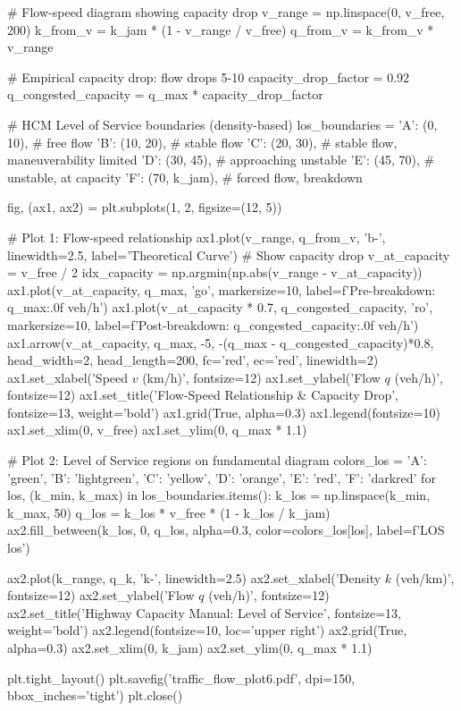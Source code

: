 \documentclass[11pt,a4paper]{article}
\begin{document}
\begin{pycode}
# Flow-speed diagram showing capacity drop
v_range = np.linspace(0, v_free, 200)
k_from_v = k_jam * (1 - v_range / v_free)
q_from_v = k_from_v * v_range

# Empirical capacity drop: flow drops 5-10%
capacity_drop_factor = 0.92
q_congested_capacity = q_max * capacity_drop_factor

# HCM Level of Service boundaries (density-based)
los_boundaries = {
    'A': (0, 10),      # free flow
    'B': (10, 20),     # stable flow
    'C': (20, 30),     # stable flow, maneuverability limited
    'D': (30, 45),     # approaching unstable
    'E': (45, 70),     # unstable, at capacity
    'F': (70, k_jam),  # forced flow, breakdown
}

fig, (ax1, ax2) = plt.subplots(1, 2, figsize=(12, 5))

# Plot 1: Flow-speed relationship
ax1.plot(v_range, q_from_v, 'b-', linewidth=2.5, label='Theoretical Curve')
# Show capacity drop
v_at_capacity = v_free / 2
idx_capacity = np.argmin(np.abs(v_range - v_at_capacity))
ax1.plot(v_at_capacity, q_max, 'go', markersize=10, label=f'Pre-breakdown: {q_max:.0f} veh/h')
ax1.plot(v_at_capacity * 0.7, q_congested_capacity, 'ro', markersize=10, label=f'Post-breakdown: {q_congested_capacity:.0f} veh/h')
ax1.arrow(v_at_capacity, q_max, -5, -(q_max - q_congested_capacity)*0.8, head_width=2, head_length=200, fc='red', ec='red', linewidth=2)
ax1.set_xlabel('Speed $v$ (km/h)', fontsize=12)
ax1.set_ylabel('Flow $q$ (veh/h)', fontsize=12)
ax1.set_title('Flow-Speed Relationship & Capacity Drop', fontsize=13, weight='bold')
ax1.grid(True, alpha=0.3)
ax1.legend(fontsize=10)
ax1.set_xlim(0, v_free)
ax1.set_ylim(0, q_max * 1.1)

# Plot 2: Level of Service regions on fundamental diagram
colors_los = {'A': 'green', 'B': 'lightgreen', 'C': 'yellow', 'D': 'orange', 'E': 'red', 'F': 'darkred'}
for los, (k_min, k_max) in los_boundaries.items():
    k_los = np.linspace(k_min, k_max, 50)
    q_los = k_los * v_free * (1 - k_los / k_jam)
    ax2.fill_between(k_los, 0, q_los, alpha=0.3, color=colors_los[los], label=f'LOS {los}')

ax2.plot(k_range, q_k, 'k-', linewidth=2.5)
ax2.set_xlabel('Density $k$ (veh/km)', fontsize=12)
ax2.set_ylabel('Flow $q$ (veh/h)', fontsize=12)
ax2.set_title('Highway Capacity Manual: Level of Service', fontsize=13, weight='bold')
ax2.legend(fontsize=10, loc='upper right')
ax2.grid(True, alpha=0.3)
ax2.set_xlim(0, k_jam)
ax2.set_ylim(0, q_max * 1.1)

plt.tight_layout()
plt.savefig('traffic_flow_plot6.pdf', dpi=150, bbox_inches='tight')
plt.close()
\end{pycode}
\end{document}
